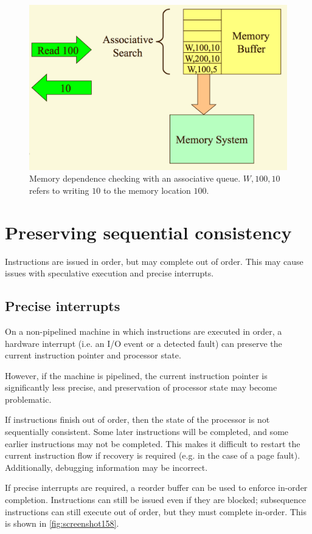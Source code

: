 \begin{figure}
\centering
\includegraphics[width=0.7\linewidth]{screenshot157}
\caption[Memory dependence checking.]{Memory dependence checking with an associative queue. $W,100,10$ refers to writing $10$ to the memory location $100$.}
\label{fig:screenshot157}
\end{figure}

\section{Preserving sequential consistency}
Instructions are issued in order, but may complete out of order. This may cause issues with speculative execution and precise interrupts.

\subsection{Precise interrupts}
On a non-pipelined machine in which instructions are executed in order, a hardware interrupt (i.e. an I/O event or a detected fault) can preserve the current instruction pointer and processor state.

However, if the machine is pipelined, the current instruction pointer is significantly less precise, and preservation of processor state may become problematic.

If instructions finish out of order, then the state of the processor is not sequentially consistent. Some later instructions will be completed, and some earlier instructions may not be completed. This makes it difficult to restart the current instruction flow if recovery is required (e.g. in the case of a page fault). Additionally, debugging information may be incorrect.

If precise interrupts are required, a reorder buffer can be used to enforce in-order completion. Instructions can still be issued even if they are blocked; subsequence instructions can still execute out of order, but they must complete in-order. This is shown in \autoref{fig:screenshot158}.

